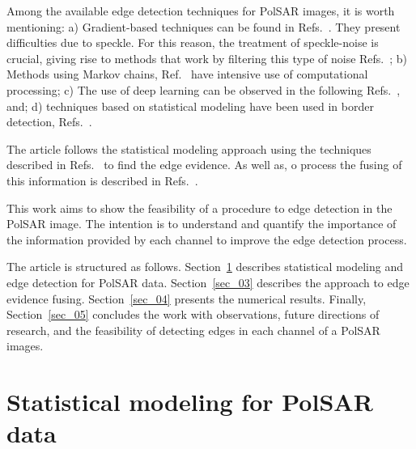 \documentclass[journal]{IEEEtran}
\begin{document}
Among the available edge detection techniques for PolSAR images, it is worth mentioning:
a) Gradient-based techniques can be found in Refs.~\cite{tlb, obw, flmc, fyf}. They present difficulties due to speckle. For this reason, the treatment of speckle-noise is crucial, giving rise to methods that work by filtering this type of noise Refs.~\cite{ lee, law, cgaf}; 
b) Methods using Markov chains, Ref.~\cite{bf} have intensive use of computational processing;
c) The use of deep learning can be observed in the following Refs.~\cite{bac, ztmxzxf, tabmm, sglmla}, and;
d) techniques based on statistical modeling have been used in border detection, Refs.~\cite{gmbf, fbgm, horrit}.

The article follows the statistical modeling approach using the techniques described in Refs.~\cite{fbgm, nhfc, bmf_2019} to find the edge evidence. As well as, o process the fusing of this information is described in Refs.~\cite{mit, sg}.

This work aims to show the feasibility of a procedure to edge detection in the PolSAR image. The intention is to understand and quantify the importance of the information provided by each channel to improve the edge detection process.

The article is structured as follows.
Section~\ref{sec_02} describes statistical modeling and edge detection for PolSAR data.
Section~\ref{sec_03} describes the approach to edge evidence fusing.
Section~\ref{sec_04} presents the numerical results.
Finally, Section~\ref{sec_05} concludes the work with observations, future directions of research, and the feasibility of detecting edges in each channel of a PolSAR images.

\section{Statistical modeling for PolSAR data}\label{sec_02}
\end{document}

